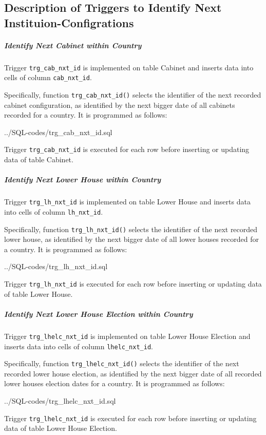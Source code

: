 \subsection{Description of Triggers to Identify Next Instituion-Configrations}\label{appendix_trigger_nxt_ids}
\subparagraph{Identify Next Cabinet within Country}\label{trg_cab_nxt_id}
Trigger \texttt{\footnotesize trg\_cab\_nxt\_id} is implemented on table Cabinet and inserts data into cells of column \texttt{\footnotesize cab\_nxt\_id}. 

Specifically, function \texttt{\footnotesize trg\_cab\_nxt\_id()} selects the identifier of the next recorded cabinet configuration, as identified by the next bigger date of all cabinets recorded for a country.
It is programmed as follows:

%
{../SQL-codes/trg_cab_nxt_id.sql}

Trigger \texttt{\footnotesize trg\_cab\_nxt\_id} is executed for each row before inserting or updating  data of table Cabinet.

\subparagraph{Identify Next Lower House within Country}\label{trg_lh_nxt_id}
Trigger \texttt{\footnotesize trg\_lh\_nxt\_id} is implemented on table Lower House and inserts data into cells of column \texttt{\footnotesize lh\_nxt\_id}. 

Specifically, function \texttt{\footnotesize trg\_lh\_nxt\_id()} selects the identifier of the next recorded lower house, as identified by the next bigger date of all lower houses recorded for a country.
It is programmed as follows:

%
{../SQL-codes/trg_lh_nxt_id.sql}

Trigger \texttt{\footnotesize trg\_lh\_nxt\_id} is executed for each row before inserting or updating  data of table Lower House. 

\subparagraph{Identify Next Lower House Election within Country}\label{trg_lhelc_nxt_id}
Trigger \texttt{\footnotesize trg\_lhelc\_nxt\_id} is implemented on table Lower House Election and inserts data into cells of column \texttt{\footnotesize lhelc\_nxt\_id}. 

Specifically, function \texttt{\footnotesize trg\_lhelc\_nxt\_id()} selects the identifier of the next recorded lower house election, as identified by the next bigger date of all recorded lower houses election dates for a country.
It is programmed as follows:

%
{../SQL-codes/trg_lhelc_nxt_id.sql}

Trigger \texttt{\footnotesize trg\_lhelc\_nxt\_id} is executed for each row before inserting or updating  data of table Lower House Election. 


